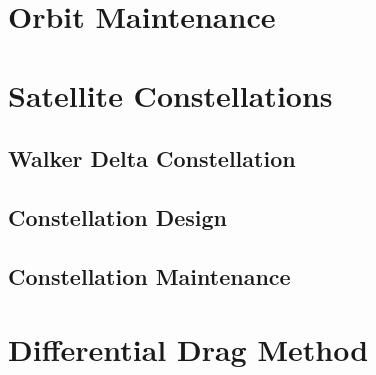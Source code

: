 \section{Orbit Maintenance}


\section{Satellite Constellations}
\subsection{Walker Delta Constellation}
\subsection{Constellation Design}
\subsection{Constellation Maintenance}


\section{Differential Drag Method}


